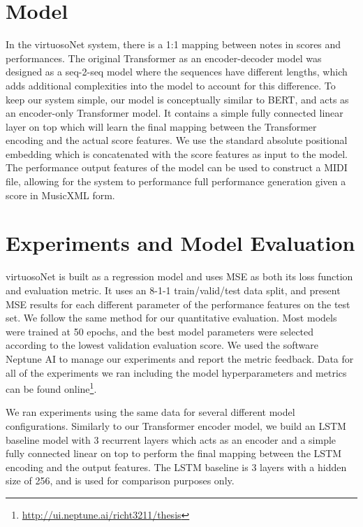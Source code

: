 \section{Model}
In the virtuosoNet system, there is a 1:1 mapping between notes in scores and performances. The original Transformer as an encoder-decoder model was designed as a seq-2-seq model where the sequences have different lengths, which adds additional complexities into the model to account for this difference. To keep our system simple, our model is conceptually similar to BERT, and acts as an encoder-only Transformer model.  It contains a simple fully connected linear layer on top which will learn the final mapping between the Transformer encoding and the actual score features. We use the standard absolute positional embedding which is concatenated with the score features as input to the model. The performance output features of the model can be used to construct a MIDI file, allowing for the system to performance full performance generation given a score in MusicXML form. 

\section{Experiments and Model Evaluation}
virtuosoNet is built as a regression model and uses MSE as both its loss function and evaluation metric. It uses an 8-1-1 train/valid/test data split, and \citet{jeong2019virtuosonet} present MSE results for each different parameter of the performance features on the test set. We follow the same method for our quantitative evaluation. Most models were trained at 50 epochs, and the best model parameters were selected according to the lowest validation evaluation score. We used the software Neptune AI \cite{neptune} to manage our experiments and report the metric feedback. Data for all of the experiments we ran including the model hyperparameters and metrics can be found online\footnote{\url{http://ui.neptune.ai/richt3211/thesis}}. 

We ran experiments using the same data for several different model configurations. Similarly to our Transformer encoder model, we build an LSTM baseline model with 3 recurrent layers which acts as an encoder and a simple fully connected linear on top to perform the final mapping between the LSTM encoding and the output features. The LSTM baseline is 3 layers with a hidden size of 256, and is used for comparison purposes only. 

